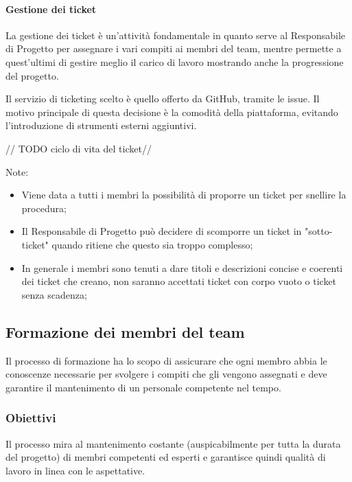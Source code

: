 \paragraph{Gestione dei ticket}
La gestione dei ticket è un'attività fondamentale in quanto serve al Responsabile di Progetto per assegnare i vari compiti ai membri del team, mentre permette a quest'ultimi di gestire meglio il carico di lavoro mostrando anche la progressione del progetto.

Il servizio di ticketing scelto è quello offerto da GitHub, tramite le issue. Il motivo principale di questa decisione è la comodità della piattaforma, evitando l'introduzione di strumenti esterni aggiuntivi.

// TODO ciclo di vita del ticket//

Note:
\begin{itemize}
\item Viene data a tutti i membri la possibilità di proporre un ticket per snellire la procedura;
\item Il Responsabile di Progetto può decidere di scomporre un ticket in "sotto-ticket" quando ritiene che questo sia troppo complesso;
\item In generale i membri sono tenuti a dare titoli e descrizioni concise e coerenti dei ticket che creano, non saranno accettati ticket con corpo vuoto o ticket senza scadenza;
\end{itemize}

\subsection{Formazione dei membri del team}
Il processo di formazione ha lo scopo di assicurare che ogni membro abbia le conoscenze necessarie per svolgere i compiti che gli vengono assegnati e deve garantire il mantenimento di un personale competente nel tempo.

\subsubsection{Obiettivi}
Il processo mira al mantenimento costante (auspicabilmente per tutta la durata del progetto) di membri competenti ed esperti e garantisce quindi qualità di lavoro in linea con le aspettative.

